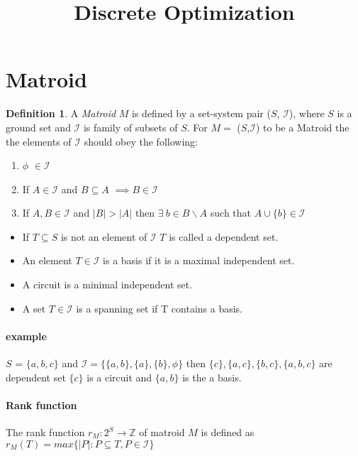 \documentclass[options]{article}
\theoremstyle{definition}
\newtheorem{definition}{Definition}
\newcommand{\independentI}{\mathcal{I}}
\begin{document}
	\title{Discrete Optimization}
	\maketitle
\section{Matroid}
\begin{definition}
 A \emph{Matroid} $M$ is defined by a set-system pair ($S$,
$\mathcal{I}$), where $S$ is a ground set and $\mathcal{I}$ is family of subsets of $S$.
For $M =$ ($S$,$\mathcal{I}$) to be a Matroid the the elements of $\mathcal{I}$
should obey the following:
\begin{enumerate}
\item $\phi$ $\in \mathcal{I}$
\item If $A \in \mathcal{I}$ and $B \subseteq A$ $\implies B \in \mathcal{I}$
\item If $A, B \in \mathcal{I}$ and $|B| > |A|$ then $ \exists \ b \in B \backslash  A$   such that $A \cup \{ b \} \in \mathcal{I}$ 
\end{enumerate}
\end{definition}

\begin{itemize}

\item If $ T \subseteq S$ is not an element of $\mathcal{I}$ $T$ is called a dependent set.
\item An element $T \in \mathcal{I}$ is a basis if it is a maximal independent set.
\item A circuit is a minimal independent set.
\item A set $T \in \mathcal{I}$  is a spanning set if T contains a basis. 
\end{itemize}
\paragraph{example} $S$ = $\{ a,b,c \}$ and $\independentI =\{ \{ a,b \},\{ a \}, \{ b \},\phi \}$ then $\{c \},\{a,c\},\{b,c\},\{a,b,c\}$ are dependent set  $\{c\}$ is a circuit and $\{ a,b\}$ is the a basis.
\paragraph{Rank function} The rank function $r_M : 2^S \rightarrow \mathbb{Z} $ of matroid $M$ is defined as $r_M (T) = max \{ |P|: P \subseteq T,P \in \independentI \}$
\end{document}

